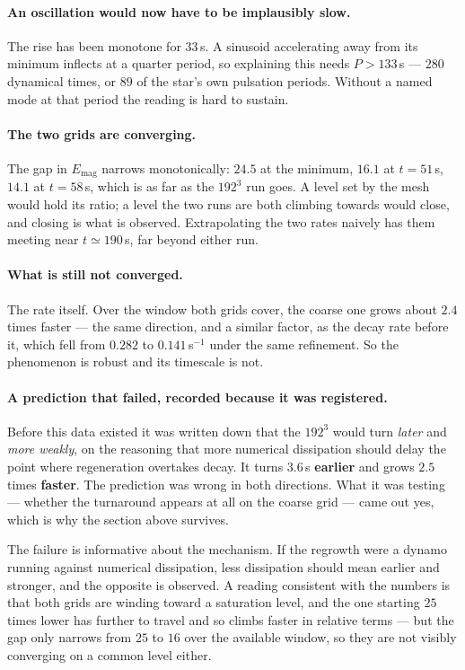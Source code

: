 \documentclass[11pt,a4paper]{article}
\newcommand{\Emag}{E_{\mathrm{mag}}}
\begin{document}
\paragraph{An oscillation would now have to be implausibly slow.} The rise has
been monotone for $33$\,s. A sinusoid accelerating away from its minimum
inflects at a quarter period, so explaining this needs $P > 133$\,s --- $280$
dynamical times, or $89$ of the star's own pulsation periods. Without a named
mode at that period the reading is hard to sustain.

\paragraph{The two grids are converging.} The gap in $\Emag$ narrows
monotonically: $24.5$ at the minimum, $16.1$ at $t = 51$\,s, $14.1$ at
$t = 58$\,s, which is as far as the $192^3$ run goes. A level set by the mesh
would hold its ratio; a level the two runs are both climbing towards would
close, and closing is what is observed. Extrapolating the two rates naively has
them meeting near $t \simeq 190$\,s, far beyond either run.

\paragraph{What is still not converged.} The rate itself. Over the window both
grids cover, the coarse one grows about $2.4$ times faster --- the same
direction, and a similar factor, as the decay rate before it, which fell from
$0.282$ to $0.141$\,s$^{-1}$ under the same refinement. So the phenomenon is
robust and its timescale is not.

\paragraph{A prediction that failed, recorded because it was registered.}
Before this data existed it was written down that the $192^3$ would turn
\emph{later} and \emph{more weakly}, on the reasoning that more numerical
dissipation should delay the point where regeneration overtakes decay. It
turns $3.6$\,s \textbf{earlier} and grows $2.5$ times \textbf{faster}. The
prediction was wrong in both directions. What it was testing --- whether the
turnaround appears at all on the coarse grid --- came out yes, which is why
the section above survives.

The failure is informative about the mechanism. If the regrowth were a dynamo
running against numerical dissipation, less dissipation should mean earlier
and stronger, and the opposite is observed. A reading consistent with the
numbers is that both grids are winding toward a saturation level, and the one
starting $25$ times lower has further to travel and so climbs faster in
relative terms --- but the gap only narrows from $25$ to $16$ over the
available window, so they are not visibly converging on a common level either.
\end{document}
